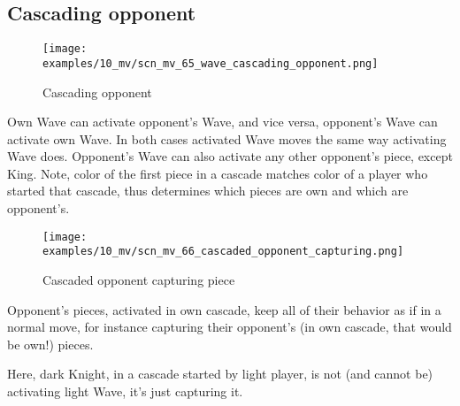 \clearpage %

\subsection*{Cascading opponent}
\label{sec:Miranda's veil/Wave/Cascading opponent}

\vspace*{-1.4\baselineskip}
\noindent
\begin{figure}[h]
\texttt{[image: examples/10\_mv/scn\_mv\_65\_wave\_cascading\_opponent.png]}
\caption{Cascading opponent}
\label{fig:scn_mv_65_wave_cascading_opponent}
\end{figure}

Own Wave can activate opponent's Wave, and vice versa, opponent's Wave can activate
own Wave. In both cases activated Wave moves the same way activating Wave does.
Opponent's Wave can also activate any other opponent's piece, except King. Note,
color of the first piece in a cascade matches color of a player who started that
cascade, thus determines which pieces are own and which are opponent's.


\clearpage %

\vspace*{-2.1\baselineskip}
\noindent
\begin{figure}[h]
\texttt{[image: examples/10\_mv/scn\_mv\_66\_cascaded\_opponent\_capturing.png]}
\caption{Cascaded opponent capturing piece}
\label{fig:scn_mv_66_cascaded_opponent_capturing}
\end{figure}

Opponent's pieces, activated in own cascade, keep all of their behavior as if in a
normal move, for instance capturing their opponent's (in own cascade, that would be
own!) pieces.

Here, dark Knight, in a cascade started by light player, is not (and cannot be)
activating light Wave, it's just capturing it.

